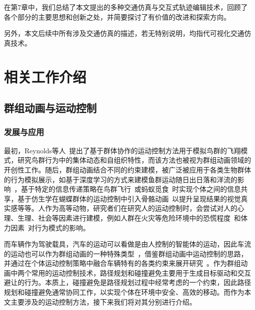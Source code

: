 在第7章中，我们总结了本文提出的多种交通仿真与交互式轨迹编辑技术，回顾了各个部分的主要思想和创新之处，并简要探讨了有价值的改进和探索方向。

另外，本文后续中所有涉及交通仿真的描述，若无特别说明，均指代可视化交通仿真技术。



\chapter{相关工作介绍}


\section{群组动画与运动控制}
\label{section:intro_crowdcontrol}

\subsection{发展与应用}

最初，Reynolds等人~\cite{reynolds1987flocks}提出了基于群体协作的运动控制方法用于模拟鸟群的飞翔模式，研究鸟群行为中的集体动态和自组织特性，而该方法也被视为群组动画领域的开创性工作。随后，群组动画结合不同的约束建模，被广泛被应用于各类生物群体的行为模拟展示，如基于深度学习的方式来建模鱼群运动随日出日落和洋流的影响~\cite{ishiwaka2021foids, ishiwaka2022deepfoids}，基于特定的信息传递策略在鸟群飞行~\cite{ren2018stable}或蚂蚁觅食~\cite{xiang2019biologically}时实现个体之间的信息共享，基于仿生学在蝴蝶群体的运动控制中引入骨骼动画~\cite{chen2022practical}以提升呈现结果的视觉真实感等等。人作为高等动物，研究者们在研究人的运动控制时，会尝试对人的心理、生理、社会等因素进行建模，例如人群在火灾等危险环境中的恐慌程度~\cite{helbing1995social}和体力因素~\cite{xu2020emotion}对行为模式的影响。

而车辆作为驾驶载具，汽车的运动可以看做是由人控制的智能体的运动，因此车流的运动也可以作为群组动画的一种特殊类型~\cite{wang2017survey}，借鉴群组动画中运动控制的思路，并通过在个体运动控制策略中融合车辆特有的各类约束来展开研究~\cite{herman1963vehicular, reynolds1999steering}。作为群组动画中两个常用的运动控制技术，路径规划和碰撞避免主要用于生成目标驱动和交互避让的行为。本质上，碰撞避免是路径规划过程中经常考虑的一个约束，因此路径规划和碰撞避免通常协同工作，以实现个体在环境中安全、高效的移动。而作为本文主要涉及的运动控制方法，接下来我们将对其分别进行介绍。


